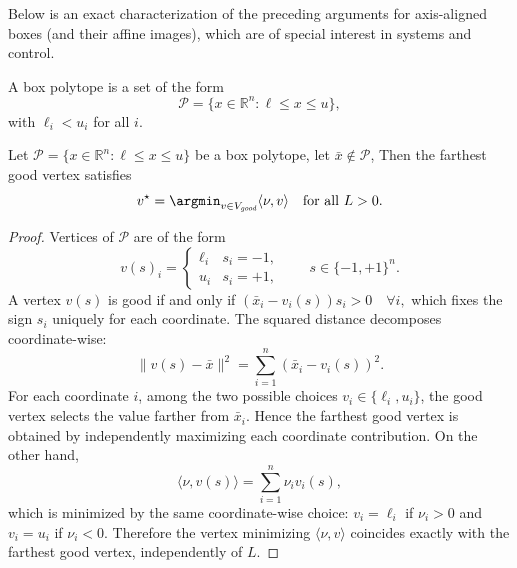 Below is an exact characterization of the preceding arguments for axis-aligned boxes (and their affine images), which are of special interest in systems and control. 
\begin{definition}
A box polytope is a set of the form
\[
\mathcal P = \{x \in \mathbb R^n : \ell \le x \le u\},
\]
with $\ell_i < u_i$ for all $i$.
\end{definition}
\begin{proposition}
\label{prop:box_no_threshold}
Let $\mathcal P = \{x \in \mathbb R^n : \ell \le x \le u\}$ be a box polytope,
let $\bar x \notin \mathcal P$, Then the farthest good vertex satisfies
\[
v^\star = \argmin_{v \in V_{\emph{good}}} \langle \nu, v \rangle
\quad \text{for all } L > 0.
\]
\end{proposition}
\begin{proof}
Vertices of $\mathcal P$ are of the form
\[
v(s)_i =
\begin{cases}
\ell_i & s_i = -1, \\
u_i & s_i = +1,
\end{cases}
\qquad s \in \{-1,+1\}^n.
\]
A vertex $v(s)$ is good if and only if $(\bar x_i - v_i(s)) s_i > 0 \quad \forall i,$
which fixes the sign $s_i$ uniquely for each coordinate.
The squared distance decomposes coordinate-wise:
\[
\|v(s) - \bar x\|^2
= \sum_{i=1}^n (\bar x_i - v_i(s))^2.
\]
For each coordinate $i$, among the two possible choices
$v_i \in \{\ell_i, u_i\}$, the good vertex selects the value farther from
$\bar x_i$. Hence the farthest good vertex is obtained by independently
maximizing each coordinate contribution. On the other hand,
\[
\langle \nu, v(s) \rangle
= \sum_{i=1}^n \nu_i v_i(s),
\]
which is minimized by the same coordinate-wise choice:
$v_i = \ell_i$ if $\nu_i > 0$ and $v_i = u_i$ if $\nu_i < 0$. Therefore the vertex minimizing $\langle \nu, v\rangle$
coincides exactly with the farthest good vertex, independently of $L$.
\end{proof}
